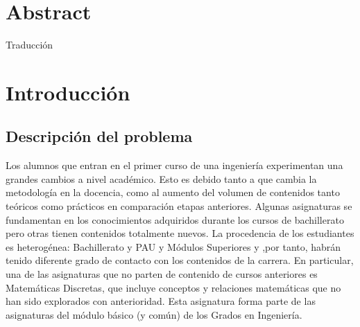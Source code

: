 \documentclass[openright,twoside,10pt]{book}
\begin{document}
    \chapter*{Abstract} %
    \begin{flushleft}

    Traducción

    \end{flushleft}

    \tableofcontents %

    \cleardoublepage
    \listoffigures %

    \cleardoublepage
    \listoftables %

    \chapter{Introducción}\label{introducciuxf3n}
    
    \section{Descripción del problema}\label{descripciuxf3n-del-problema}
    
    
    Los alumnos que entran en el primer curso de una ingeniería experimentan
    una grandes cambios a nivel académico. Esto es debido tanto a que cambia
    la metodología en la docencia, como al aumento del volumen de contenidos
    tanto teóricos como prácticos en comparación etapas anteriores. Algunas
    asignaturas se fundamentan en los conocimientos adquiridos durante los
    cursos de bachillerato pero otras tienen contenidos totalmente nuevos.
    La procedencia de los estudiantes es heterogénea: Bachillerato y PAU y
    Módulos Superiores y ,por tanto, habrán tenido diferente grado de
    contacto con los contenidos de la carrera. En particular, una de las
    asignaturas que no parten de contenido de cursos anteriores es
    Matemáticas Discretas, que incluye conceptos y relaciones matemáticas
    que no han sido explorados con anterioridad. Esta asignatura forma parte
    de las asignaturas del módulo básico (y común) de los Grados en
    Ingeniería.
    
\end{document}
